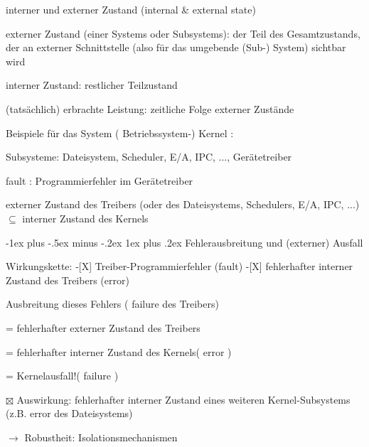 \documentclass[a4paper]{article}
\makeatletter
\renewcommand{\subsubsection}{\@startsection{subsubsection}{3}{0mm}%
 {-1ex plus -.5ex minus -.2ex}%
 {1ex plus .2ex}%
 {\normalfont\small\bfseries}}
\makeatother
\begin{document}
\begin{multicols}{3}
    \begin{itemize*}
        \item
        interner und externer Zustand (internal \& external state)
        \begin{itemize*}
            \item externer Zustand (einer Systems oder Subsystems): der Teil des Gesamtzustands, der an externer Schnittstelle (also für das umgebende (Sub-) System) sichtbar wird
            \item interner Zustand: restlicher Teilzustand
            \item (tatsächlich) erbrachte Leistung: zeitliche Folge externer Zustände
        \end{itemize*}
        \item
        Beispiele für das System ( Betriebssystem-) Kernel :
        \begin{itemize*}
            \item Subsysteme: Dateisystem, Scheduler, E/A, IPC, ..., Gerätetreiber
            \item fault : Programmierfehler im Gerätetreiber
            \item externer Zustand des Treibers (oder des Dateisystems, Schedulers, E/A, IPC, ...) $\subseteq$ interner Zustand des Kernels
        \end{itemize*}
    \end{itemize*}


    \subsubsection{Fehlerausbreitung und (externer)
        Ausfall}

    \begin{itemize*}
        \item
        Wirkungskette: -{[}X{]} Treiber-Programmierfehler (fault) -{[}X{]}
        fehlerhafter interner Zustand des Treibers (error)
        \begin{itemize*}
            \item Ausbreitung dieses Fehlers ( failure des Treibers)
            \item = fehlerhafter externer Zustand des Treibers
            \item = fehlerhafter interner Zustand des Kernels( error )
            \item = Kernelausfall!( failure )
        \end{itemize*}
        \item[$\boxtimes$]
        Auswirkung: fehlerhafter interner Zustand eines weiteren
        Kernel-Subsystems (z.B. error des Dateisystems)
        \item
        $\rightarrow$  Robustheit: Isolationsmechanismen
        \item
    \end{itemize*}



\end{multicols}
\end{document}
